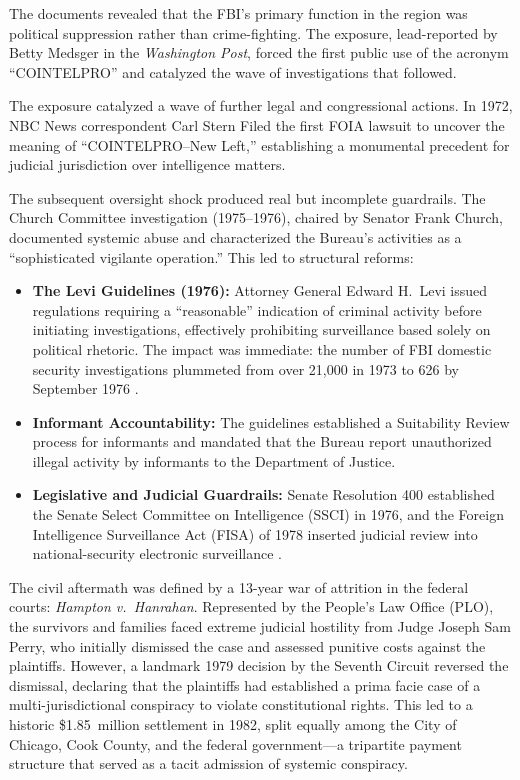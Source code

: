 \documentclass[12pt,openany]{book}
\begin{document}
The documents revealed that the FBI's primary function in the region was political suppression rather than crime-fighting. The exposure, lead-reported by Betty Medsger in the \textit{Washington Post}, forced the first public use of the acronym ``COINTELPRO'' and catalyzed the wave of investigations that followed.

The exposure catalyzed a wave of further legal and congressional actions. In 1972, NBC News correspondent Carl Stern Filed the first FOIA lawsuit to uncover the meaning of ``COINTELPRO--New Left,'' establishing a monumental precedent for judicial jurisdiction over intelligence matters.

The subsequent oversight shock produced real but incomplete guardrails. The Church Committee investigation (1975--1976), chaired by Senator Frank Church, documented systemic abuse and characterized the Bureau's activities as a ``sophisticated vigilante operation.'' This led to structural reforms:
\begin{itemize}
    \item \textbf{The Levi Guidelines (1976):} Attorney General Edward H.\ Levi issued regulations requiring a ``reasonable'' indication of criminal activity before initiating investigations, effectively prohibiting surveillance based solely on political rhetoric. The impact was immediate: the number of FBI domestic security investigations plummeted from over 21,000 in 1973 to 626 by September 1976 \cite{doj_oig_levi_guidelines}.
    \item \textbf{Informant Accountability:} The guidelines established a Suitability Review process for informants and mandated that the Bureau report unauthorized illegal activity by informants to the Department of Justice.
    \item \textbf{Legislative and Judicial Guardrails:} Senate Resolution 400 established the Senate Select Committee on Intelligence (SSCI) in 1976, and the Foreign Intelligence Surveillance Act (FISA) of 1978 inserted judicial review into national-security electronic surveillance \cite{sres400_1976, fisa_1978}.
\end{itemize}

The civil aftermath was defined by a 13-year war of attrition in the federal courts: \textit{Hampton v.\ Hanrahan}. Represented by the People's Law Office (PLO), the survivors and families faced extreme judicial hostility from Judge Joseph Sam Perry, who initially dismissed the case and assessed punitive costs against the plaintiffs. However, a landmark 1979 decision by the Seventh Circuit reversed the dismissal, declaring that the plaintiffs had established a prima facie case of a multi-jurisdictional conspiracy to violate constitutional rights. This led to a historic \$1.85~million settlement in 1982, split equally among the City of Chicago, Cook County, and the federal government---a tripartite payment structure that served as a tacit admission of systemic conspiracy.
\end{document}
